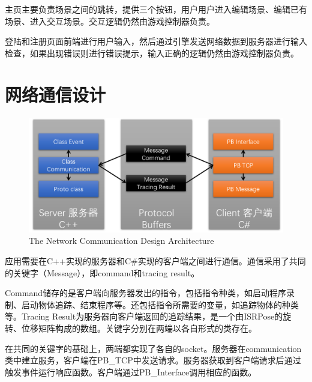 主页主要负责场景之间的跳转，提供三个按钮，用户用户进入编辑场景、编辑已有场景、进入交互场景。交互逻辑仍然由游戏控制器负责。

登陆和注册页面前端进行用户输入，然后通过引擎发送网络数据到服务器进行输入检查，如果出现错误则进行错误提示，输入正确的逻辑仍然由游戏控制器负责。

\section{网络通信设计}
\begin{figure}[!htp]
  \centering
  \includegraphics[width=12cm]{figure/netarc.png}
    {The Network Communication Design Architecture}
 \label{fig:gm}
\end{figure}
应用需要在C++实现的服务器和C\#实现的客户端之间进行通信。通信采用了共同的关键字（Message），即command和tracing result。

Command储存的是客户端向服务器发出的指令，包括指令种类，如启动程序录制、启动物体追踪、结束程序等。还包括指令所需要的变量，如追踪物体的种类等。Tracing Result为服务器向客户端返回的追踪结果，是一个由ISRPose的旋转、位移矩阵构成的数组。关键字分别在两端以各自形式的类存在。

在共同的关键字的基础上，两端都实现了各自的socket。服务器在communication类中建立服务，客户端在PB\_TCP中发送请求。服务器获取到客户端请求后通过触发事件运行响应函数。客户端通过PB\_Interface调用相应的函数。
